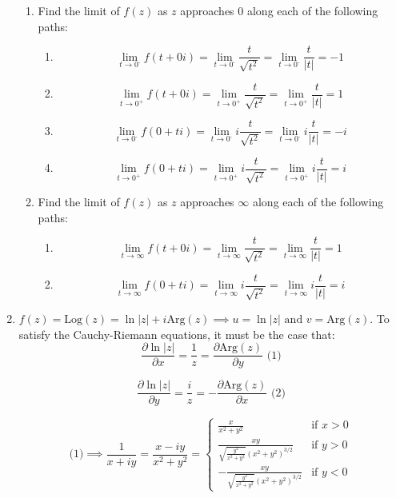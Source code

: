 \documentclass{article}
\newcommand{\Log}{\text{Log}}
\newcommand{\Arg}{\text{Arg}}
\begin{document}
\begin{enumerate}
\begin{enumerate}
		\item Find the limit of $f(z)$ as $z$ approaches 0 along each of the following paths:
		\begin{enumerate}
			\item \[ \lim_{t\to 0^{\text{-}}}f(t+0i)=\lim_{t\to 0^{\text{-}}}\frac{t}{\sqrt{t^2}} = \lim_{t\to 0^{\text{-}}}\frac{t}{|t|} = -1\]
			\item \[ \lim_{t\to 0^{\text{+}}}f(t+0i)=\lim_{t\to 0^{\text{+}}}\frac{t}{\sqrt{t^2}} = \lim_{t\to 0^{\text{+}}}\frac{t}{|t|} = 1\]
			\item \[ \lim_{t\to 0^{\text{-}}}f(0+ti)=\lim_{t\to 0^{\text{-}}}i\frac{t}{\sqrt{t^2}} = \lim_{t\to 0^{\text{-}}}i\frac{t}{|t|} = -i\]
			\item \[ \lim_{t\to 0^{\text{+}}}f(0+ti)=\lim_{t\to 0^{\text{+}}}i\frac{t}{\sqrt{t^2}} = \lim_{t\to 0^{\text{+}}}i\frac{t}{|t|} = i\]
		\end{enumerate}
		
		\item Find the limit of $f(z)$ as $z$ approaches $\infty$ along each of the following paths:
		\begin{enumerate}
			\item \[ \lim_{t\to\infty}f(t+0i)=\lim_{t\to\infty}\frac{t}{\sqrt{t^2}}=\lim_{t\to\infty}\frac{t}{|t|}=1 \]
			\item \[ \lim_{t\to\infty}f(0+ti)=\lim_{t\to\infty}i\frac{t}{\sqrt{t^2}}=\lim_{t\to\infty}i\frac{t}{|t|}=i \]
		\end{enumerate}
		
	\end{enumerate}	
	
	\item $f(z)=\Log(z)=\ln|z|+i\Arg(z) \implies u = \ln|z| \text{ and } v = \Arg(z)$. To satisfy the Cauchy-Riemann equations, it must be the case that:
	\[\frac{\partial \ln|z|}{\partial x} = \frac{1}{z}= \frac{\partial \Arg(z)}{\partial y} \text{   (1)}\]
	
	\[\frac{\partial \ln|z|}{\partial y}=\frac{i}{z}=-\frac{\partial \Arg(z)}{\partial x} \text{   (2)}\]
	
	\[\text{(1)}\implies  \frac{1}{x+iy}=\frac{x-iy}{x^2+y^2}=
		\begin{cases}
			\frac{x}{x^2+y^2} & \text{if $x>0$} \\
			\frac{xy}{\sqrt{\frac{y^2}{x^2+y^2}}(x^2+y^2)^{3/2}} & \text{if $y>0$} \\
			-\frac{xy}{\sqrt{\frac{y^2}{x^2+y^2}}(x^2+y^2)^{3/2}} & \text{if $y<0$}
		\end{cases}
	\]
	

\end{enumerate}
\end{document}

